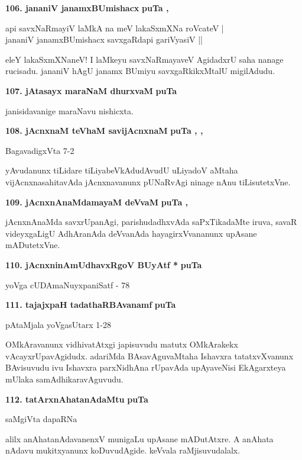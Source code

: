 \medskip
\noindent
\textbf{106. jananiV janamxBUmishacx} \hfill{\bf puTa , }

\begin{shloka}
api savxNaRmayiV laMkA na meV lakaSxmXNa roVcateV |\\
jananiV janamxBUmishacx savxgaRdapi gariVyasiV ||
\end{shloka}

eleY lakaSxmXNaneV! I laMkeyu savxNaRmayaveV AgidadxrU saha nanage rucisadu. jananiV hAgU janamx BUmiyu savxgaRkikxMtalU migilAdudu.

\medskip
\noindent
\textbf{107. jAtasayx maraNaM dhurxvaM} \hfill{\bf puTa }

\smallskip
janisidavanige maraNavu nishicxta.

\medskip
\noindent
\textbf{108. jAcnxnaM teVhaM savijAcnxnaM} \hfill{\bf puTa , , }

\hfill{BagavadigxVta 7-2}

yAvudanunx tiLidare tiLiyabeVkAdudAvudU uLiyadoV aMtaha vijAcnxnasahitavAda jAcnxnavanunx pUNaRvAgi ninage nAnu tiLisutetxVne.

\medskip
\noindent
\textbf{109. jAcnxnAnaMdamayaM deVvaM} \hfill{\bf puTa , }

\smallskip
jAcnxnAnaMda savxrUpanAgi, parishudadhxvAda saPxTikadaMte iruva, savaR videyxgaLigU AdhAranAda deVvanAda hayagirxVvananunx upAsane mADutetxVne.

\medskip
\noindent
\textbf{110. jAcnxninAmUdhavxRgoV BUyAtf *} \hfill{\bf puTa }

\hfill{yoVga cUDAmaNuyxpaniSatf - 78}

\medskip
\noindent
\textbf{111. tajajxpaH tadathaRBAvanamf} \hfill{\bf puTa }

\hfill{pAtaMjala yoVgasUtarx 1-28}

\smallskip
OMkAravanunx vidhivatAtxgi japisuvudu matutx OMkArakekx vAcayxrUpavAgidudx. adariMda BAsavAguvaMtaha Ishavxra tatatxvXvanunx BAvisuvudu ivu Ishavxra parxNidhAna rUpavAda upAyaveNisi EkAgarxteya mUlaka samAdhikaravAguvudu.

\medskip
\noindent
\textbf{112. tatArxnAhatanAdaMtu} \hfill{\bf puTa }

\hfill{saMgiVta dapaRNa}

\smallskip
alilx anAhatanAdavanenxV munigaLu upAsane mADutAtxre. A anAhata nAdavu mukitxyanunx koDuvudAgide. keVvala raMjisuvudalalx.

